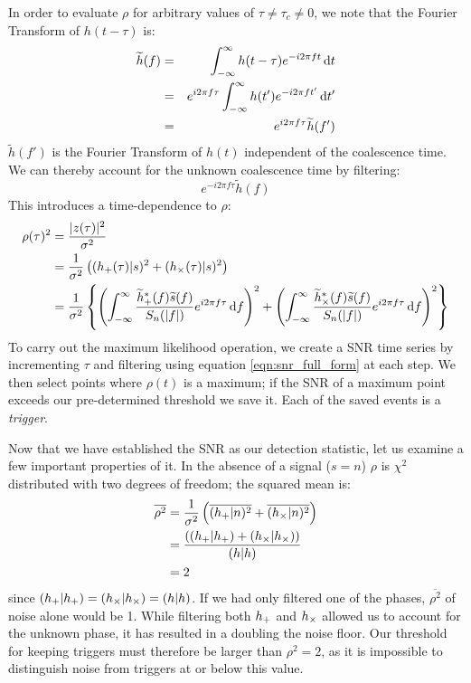 In order to evaluate $\rho$ for arbitrary values of $\tau \neq \tau_c \neq 0$, we note that the Fourier Transform of $h(t-\tau)$ is: 
\begin{eqnarray}
\widetilde{h}(f) & = & \int_{-\infty}^{\infty} h(t-\tau) e^{-i 2\pi f t} \,\mathrm{d} t \nonumber \\
& = & e^{i 2\pi f \tau} \int_{-\infty}^{\infty} h(t') e^{-i 2\pi ft'} \,\mathrm{d} t' \nonumber \\
& = & e^{i 2\pi f \tau} \widetilde{h}(f')
\end{eqnarray}
$\widetilde{h}(f')$ is the Fourier Transform of $h(t)$ independent of the coalescence time. We can thereby account for the unknown coalescence time by filtering:
\begin{equation*}
e^{-i 2\pi f\tau} \widetilde{h}(f)
\end{equation*}
This introduces a time-dependence to $\rho$:
\begin{align}
\rho(\tau)^2 &= \frac{|z(\tau)|^2}{\sigma^2} \nonumber \\
 &= \frac{1}{\sigma^2}\left( (h_{\pls}(\tau)|s)^2 + (h_{\crs}(\tau)|s)^2 \right) \nonumber \\
\label{eqn:snr_full_form}
 &= \frac{1}{\sigma^2}\left\{ \left( \int_{-\infty}^{\infty} \frac{\widetilde{h}_{\pls}^{*}(f)\widetilde{s}(f)}{S_n(|f|)} e^{i 2\pi f\tau} \d f \right)^2 + \left( \int_{-\infty}^{\infty} \frac{\widetilde{h}_{\crs}^{*}(f)\widetilde{s}(f)}{S_n(|f|)} e^{i 2\pi f\tau} \d f \right)^2 \right\}
\end{align}
To carry out the maximum likelihood operation, we create a \ac{SNR} time series by incrementing $\tau$ and filtering using equation \ref{eqn:snr_full_form} at each step. We then select points where $\rho(t)$ is a maximum; if the \ac{SNR} of a maximum point exceeds our pre-determined threshold we save it. Each of the saved events is a \emph{trigger}.

Now that we have established the \ac{SNR} as our detection statistic, let us examine a few important properties of it. In the absence of a signal ($s = n$) $\rho$ is $\chi^2$ distributed with two degrees of freedom; the squared mean is:
\begin{align}
\overline{\rho^2} &= \frac{1}{\sigma^2}\left( \overline{(h_{+}|n)^2} + \overline{(h_{\times}|n)^2} \right) \nonumber \\
 &= \frac{ \left( (h_{+}|h_{+}) + (h_{\times}|h_{\times}) \right)}{(h|h)} \nonumber \\
 &= 2
\end{align}
since $(h_{+}|h_{+}) = (h_{\times}|h_{\times}) = (h|h)$. If we had only filtered one of the phases, $\overline{\rho^2}$ of noise alone would be 1. While filtering both $h_{+}$ and $h_{\times}$ allowed us to account for the unknown phase, it has resulted in a doubling the noise floor. Our threshold for keeping triggers must therefore be larger than $\rho^{2} = 2$, as it is impossible to distinguish noise from triggers at or below this value.

